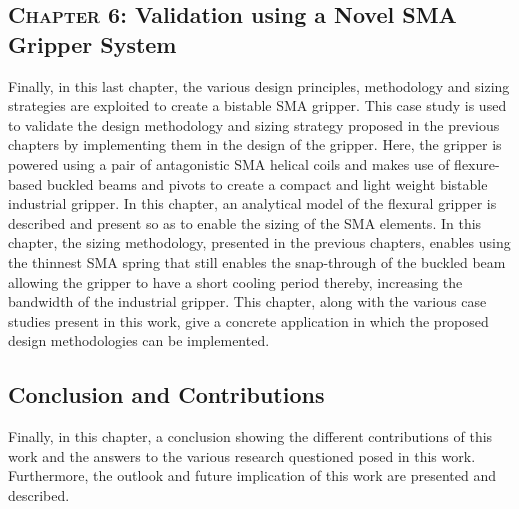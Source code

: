 \subsection*{\textsc{Chapter 6}: Validation using a Novel SMA Gripper System}
Finally, in this last chapter, the various design principles, methodology and sizing strategies are exploited to create a bistable SMA gripper. This case study is used to validate the design methodology and sizing strategy proposed in the previous chapters by implementing them in the design of the gripper. Here, the gripper is powered using a pair of antagonistic SMA helical coils and makes use of flexure-based buckled beams and pivots to create a compact and light weight bistable industrial gripper. In this chapter, an analytical model of the flexural gripper is described and present so as to enable the sizing of the SMA elements. In this chapter, the sizing methodology, presented in the previous chapters, enables using the thinnest SMA spring that still enables the snap-through of the buckled beam allowing the gripper to have a short cooling period thereby, increasing the bandwidth of the industrial gripper. This chapter, along with the various case studies present in this work, give a concrete application in which the proposed design methodologies can be implemented.

\subsection*{Conclusion and Contributions}
Finally, in this chapter, a conclusion showing the different contributions of this work and the answers to the various research questioned posed in this work. Furthermore, the outlook and future implication of this work are presented and described.
